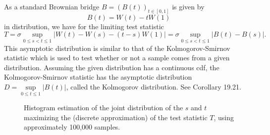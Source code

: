 \begin{remark} \label{remark:onedim_KolmogorovSmirnov}
    As a standard Brownian bridge $B = (B(t))_{t \in [0, 1]}$ is given by
    \begin{equation*}
        B(t) = W(t) - t W(1)
    \end{equation*}
    in distribution, we have for the limiting test statistic
    \begin{equation*}
        T = \sigma \sup\limits_{0 \leq s < t \leq 1} \left| W(t) - W(s) - (t-s) W(1) \right| = \sigma \sup\limits_{0 \leq s < t \leq 1} \left| B(t) - B(s) \right|.
    \end{equation*}
    This asymptotic distribution is similar to that of the Kolmogorov-Smirnov statistic which is used to test whether or not a sample comes from a given distribution. Assuming the given distribution has a continuous cdf, the Kolmogorov-Smirnov statistic has the asymptotic distribution $D = \sup\limits_{0 \leq t \leq 1} |B(t)|$, called the Kolmogorov distribution. See \cite{vaart_1998} Corollary 19.21.
\end{remark}


\begin{figure}
    \centering
    \caption{Histogram estimation of the joint distribution of the $s$ and $t$ maximizing the (discrete approximation) of the test statistic $T$, using approximately 100,000 samples.}
\end{figure}

